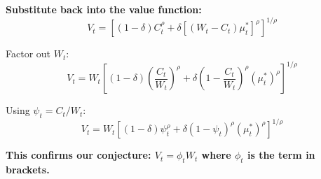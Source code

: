 \documentclass{beamer}
\begin{document}
\begin{frame}[allowframebreaks]
    \framebreak
    
    \textbf{Substitute back into the value function:}
    \begin{equation*}
        V_t = \left[ (1-\delta)C_t^{\rho} + \delta [(W_t - C_t) \mu_t^*]^{\rho} \right]^{1/\rho}
    \end{equation*}
    
    Factor out $W_t$:
    \begin{equation*}
        V_t = W_t \left[ (1-\delta)\left(\frac{C_t}{W_t}\right)^{\rho} + \delta \left(1 - \frac{C_t}{W_t}\right)^{\rho} (\mu_t^*)^{\rho} \right]^{1/\rho}
    \end{equation*}
    
    Using $\psi_t = C_t/W_t$:
    \begin{equation*}
        V_t = W_t \left[ (1-\delta)\psi_t^{\rho} + \delta (1 - \psi_t)^{\rho} (\mu_t^*)^{\rho} \right]^{1/\rho}
    \end{equation*}
    
    \textbf{This confirms our conjecture: $V_t = \phi_t W_t$ where $\phi_t$ is the term in brackets.}
\end{frame}
\end{document}
